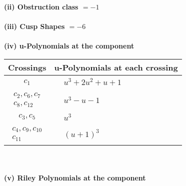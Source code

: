 \documentclass[1p]{elsarticle_modified}
\theoremstyle{definition}
\begin{document}
\flushleft \textbf{(ii) Obstruction class $= -1$}\\~\\
\flushleft \textbf{(iii) Cusp Shapes $= -6$}\\~\\
\newpage\renewcommand{\arraystretch}{1}
\flushleft \textbf{(iv) u-Polynomials at the component}\newline \\
\begin{tabular}{m{50pt}|m{274pt}}
Crossings & \hspace{64pt}u-Polynomials at each crossing \\
\hline $$\begin{aligned}c_{1}\end{aligned}$$&$\begin{aligned}
&u^3+2 u^2+u+1
\end{aligned}$\\
\hline $$\begin{aligned}c_{2},c_{6},c_{7}\\c_{8},c_{12}\end{aligned}$$&$\begin{aligned}
&u^3- u-1
\end{aligned}$\\
\hline $$\begin{aligned}c_{3},c_{5}\end{aligned}$$&$\begin{aligned}
&u^3
\end{aligned}$\\
\hline $$\begin{aligned}c_{4},c_{9},c_{10}\\c_{11}\end{aligned}$$&$\begin{aligned}
&(u+1)^3
\end{aligned}$\\
\hline
\end{tabular}\\~\\
\newpage\renewcommand{\arraystretch}{1}
\flushleft \textbf{(v) Riley Polynomials at the component}\newline \\
\end{document}
